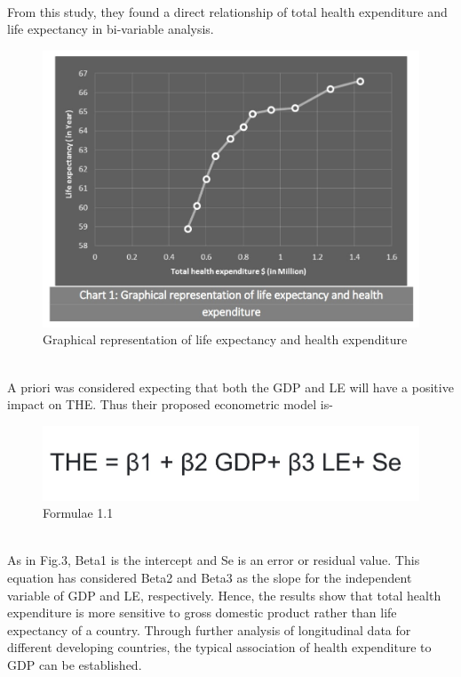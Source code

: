 \documentclass[conference]{IEEEtran}
\begin{document}
\\From this study, they found a direct relationship of total health expenditure and life expectancy in bi-variable analysis.
\begin{figure}[htbp]
    \centerline{\includegraphics[scale=0.5]{healthcare1.jpg}}
    \caption{Graphical representation of life expectancy and health expenditure}
\end{figure}
\\A priori was considered expecting that both the GDP and LE will have a positive impact on THE. Thus their proposed econometric model is-
\begin{figure}[htbp]
    \centerline{\includegraphics[scale=0.3]{healthcare3.jpg}}
    \caption{Formulae 1.1}
\end{figure}
\\As in Fig.3, Beta1 is the intercept and Se is an error or residual value. This equation has considered Beta2 and Beta3 as the slope for the independent variable of GDP and LE, respectively.
Hence, the results show that total health expenditure is more sensitive to gross domestic product rather than life expectancy of a country. Through further analysis of longitudinal data for different developing countries, the typical association of health expenditure to GDP can be established.
\bigskip
\end{document}
